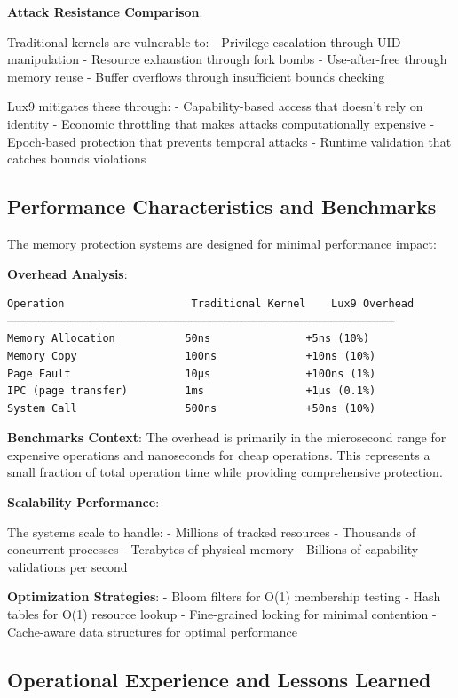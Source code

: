 \documentclass[11pt,letterpaper]{article}
\begin{document}
\textbf{Attack Resistance Comparison}:

Traditional kernels are vulnerable to:
- Privilege escalation through UID manipulation
- Resource exhaustion through fork bombs
- Use-after-free through memory reuse
- Buffer overflows through insufficient bounds checking

Lux9 mitigates these through:
- Capability-based access that doesn't rely on identity
- Economic throttling that makes attacks computationally expensive
- Epoch-based protection that prevents temporal attacks
- Runtime validation that catches bounds violations

\subsection{Performance Characteristics and Benchmarks}

The memory protection systems are designed for minimal performance impact:

\textbf{Overhead Analysis}:

\begin{lstlisting}
Operation                    Traditional Kernel    Lux9 Overhead
─────────────────────────────────────────────────────────────
Memory Allocation           50ns               +5ns (10%)
Memory Copy                 100ns              +10ns (10%)
Page Fault                  10μs               +100ns (1%)
IPC (page transfer)         1ms                +1μs (0.1%)
System Call                 500ns              +50ns (10%)
\end{lstlisting}

\textbf{Benchmarks Context}: The overhead is primarily in the microsecond range for expensive operations and nanoseconds for cheap operations. This represents a small fraction of total operation time while providing comprehensive protection.

\textbf{Scalability Performance}:

The systems scale to handle:
- Millions of tracked resources
- Thousands of concurrent processes
- Terabytes of physical memory
- Billions of capability validations per second

\textbf{Optimization Strategies}:
- Bloom filters for O(1) membership testing
- Hash tables for O(1) resource lookup
- Fine-grained locking for minimal contention
- Cache-aware data structures for optimal performance

\subsection{Operational Experience and Lessons Learned}
\end{document}
